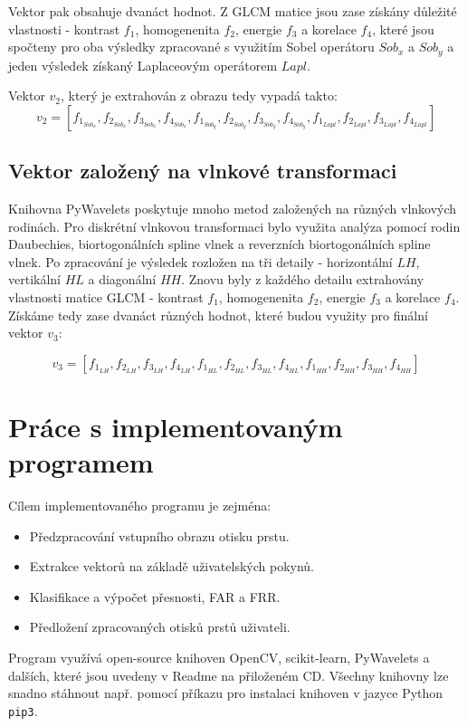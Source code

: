 Vektor pak obsahuje dvanáct hodnot. Z GLCM matice jsou zase získány důležité vlastnosti - kontrast $f_1$, homogenenita $f_2$, energie $f_3$ a korelace $f_4$, které jsou spočteny pro oba výsledky zpracované s využitím Sobel operátoru $Sob_x$ a $Sob_y$ a jeden výsledek získaný Laplaceovým operátorem $Lapl$.

Vektor $v_2$, který je extrahován z obrazu tedy vypadá takto:
$$v_2 = [f_{1_{Sob_x}}, f_{2_{Sob_x}}, f_{3_{Sob_x}}, f_{4_{Sob_x}}, f_{1_{Sob_y}}, f_{2_{Sob_y}}, f_{3_{Sob_y}}, f_{4_{Sob_y}}, f_{1_{Lapl}}, f_{2_{Lapl}}, f_{3_{Lapl}}, f_{4_{Lapl}}]$$

\subsection{Vektor založený na vlnkové transformaci}
Knihovna PyWavelets poskytuje mnoho metod založených na různých vlnkových rodinách. Pro diskrétní vlnkovou transformaci bylo využita analýza pomocí rodin Daubechies, biortogonálních spline vlnek a reverzních biortogonálních spline vlnek. Po zpracování je výsledek rozložen na tři detaily - horizontální $LH$, vertikální $HL$ a diagonální $HH$. Znovu byly z každého detailu extrahovány vlastnosti matice GLCM - kontrast $f_1$, homogenenita $f_2$, energie $f_3$ a korelace $f_4$. Získáme tedy zase dvanáct různých hodnot, které budou využity pro finální vektor $v_3$:

$$v_3 = [f_{1_{LH}}, f_{2_{LH}}, f_{3_{LH}}, f_{4_{LH}}, f_{1_{HL}}, f_{2_{HL}}, f_{3_{HL}}, f_{4_{HL}}, f_{1_{HH}}, f_{2_{HH}}, f_{3_{HH}}, f_{4_{HH}}]$$

\section{Práce s implementovaným programem}
Cílem implementovaného programu je zejména:
\begin{itemize}
    \item Předzpracování vstupního obrazu otisku prstu.
    \item Extrakce vektorů na základě uživatelských pokynů.
    \item Klasifikace a výpočet přesnosti, FAR a FRR.
    \item Předložení zpracovaných otisků prstů uživateli.
\end{itemize}

Program využívá open-source knihoven OpenCV, scikit-learn, PyWavelets a dalších, které jsou uvedeny v Readme na přiloženém CD. Všechny knihovny lze snadno stáhnout např. pomocí příkazu pro instalaci knihoven v jazyce Python \verb|pip3|. 

